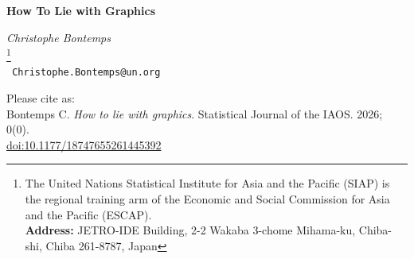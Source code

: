 \documentclass[11pt,twoside,a4paper]{article}
\begin{document}
\begin{center}
\Large{ \textbf{How To Lie with Graphics}} \\
\vspace{0.2cm}
\vspace{0.5cm}

 \textit{Christophe Bontemps}\\ %
  \footnote{The United Nations Statistical Institute for Asia and the Pacific (SIAP) is the regional training arm of the Economic and Social Commission for Asia and the Pacific (ESCAP).\\
 \noindent \textbf{Address:}  JETRO-IDE Building, 2-2 Wakaba 3-chome Mihama-ku, Chiba-shi, Chiba 261-8787, Japan  }\\

\vspace{0.5cm}
\texttt{\normalsize{ Christophe.Bontemps@un.org}}\\
\end{center}

\vspace{0.5cm}

\indent \footnotesize{Please cite as:\\
\indent Bontemps C. \emph{How to lie with graphics}. Statistical Journal of the IAOS. 2026; 0(0).\\
\indent \href{doi:10.1177/18747655261445392}{doi:10.1177/18747655261445392} 
}




\vspace{0.1cm}
\end{document}
